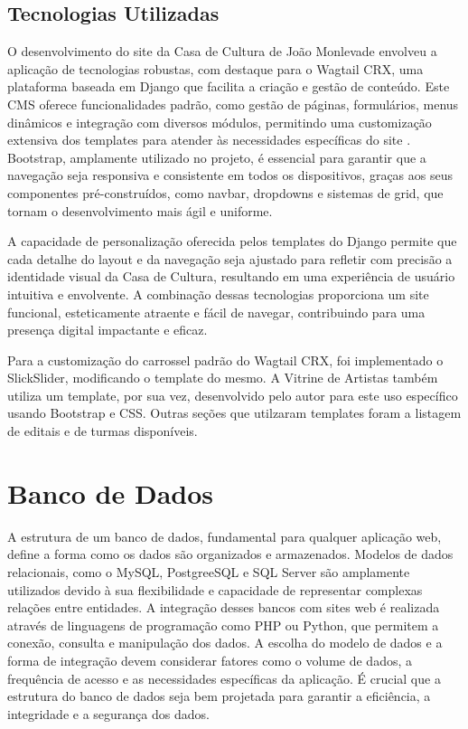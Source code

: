 \subsection{Tecnologias Utilizadas}

O desenvolvimento do site da Casa de Cultura de João Monlevade envolveu a aplicação de tecnologias robustas, com destaque para o Wagtail CRX, uma plataforma baseada em Django que facilita a criação e gestão de conteúdo. Este \ac{CMS} oferece funcionalidades padrão, como gestão de páginas, formulários, menus dinâmicos e integração com diversos módulos, permitindo uma customização extensiva dos templates para atender às necessidades específicas do site \cite{ellis2015coders}. Bootstrap, amplamente utilizado no projeto, é essencial para garantir que a navegação seja responsiva e consistente em todos os dispositivos, graças aos seus componentes pré-construídos, como navbar, dropdowns e sistemas de grid, que tornam o desenvolvimento mais ágil e uniforme. 

A capacidade de personalização oferecida pelos templates do Django permite que cada detalhe do layout e da navegação seja ajustado para refletir com precisão a identidade visual da Casa de Cultura, resultando em uma experiência de usuário intuitiva e envolvente. A combinação dessas tecnologias proporciona um site funcional, esteticamente atraente e fácil de navegar, contribuindo para uma presença digital impactante e eficaz.

Para a customização do carrossel padrão do Wagtail CRX, foi implementado o SlickSlider, modificando o template do mesmo. A Vitrine de Artistas também utiliza um template, por sua vez, desenvolvido pelo autor para este uso específico usando Bootstrap e \ac{CSS}. Outras seções que utilzaram templates foram a listagem de editais e de turmas disponíveis.

\section{Banco de Dados}

A estrutura de um banco de dados, fundamental para qualquer aplicação web, define a forma como os dados são organizados e armazenados. Modelos de dados relacionais, como o MySQL, PostgreeSQL e SQL Server são amplamente utilizados devido à sua flexibilidade e capacidade de representar complexas relações entre entidades. A integração desses bancos com sites web é realizada através de linguagens de programação como PHP ou Python, que permitem a conexão, consulta e manipulação dos dados. A escolha do modelo de dados e a forma de integração devem considerar fatores como o volume de dados, a frequência de acesso e as necessidades específicas da aplicação. É crucial que a estrutura do banco de dados seja bem projetada para garantir a eficiência, a integridade e a segurança dos dados.

